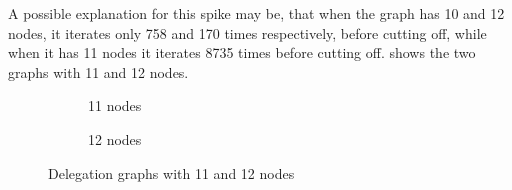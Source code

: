 A possible explanation for this spike may be, that when the graph has 10 and 12 nodes, it iterates only 758 and 170 times respectively, before cutting off, while when it has 11 nodes it iterates 8735 times before cutting off.  shows the two graphs with 11 and 12 nodes.

\begin{figure}[h]
    \centering
    \begin{subfigure}[t]{0.45\textwidth}
        \centering
        \caption{11 nodes}
        \label{subfig:random-11and12-11}
    \end{subfigure}
    \hfill
    \begin{subfigure}[t]{0.45\textwidth}
        \centering
        \caption{12 nodes}
    \end{subfigure}
    \caption{Delegation graphs with 11 and 12 nodes}
    \label{fig:random-11and12}
\end{figure}

